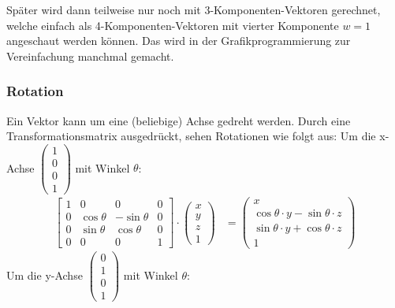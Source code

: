 \documentclass[titlepage, 11pt, a4paper, ngerman]{article}
\begin{document}
\bigbreak
Später wird dann teilweise nur noch mit 3-Komponenten-Vektoren gerechnet, welche einfach als 4-Komponenten-Vektoren mit vierter Komponente $w = 1$ angeschaut werden können. Das wird in der Grafikprogrammierung zur Vereinfachung manchmal gemacht.

\subsubsection{Rotation}
Ein Vektor kann um eine (beliebige) Achse gedreht werden. Durch eine Transformationsmatrix ausgedrückt, sehen Rotationen wie folgt aus: \bigbreak
Um die x-Achse $
\begin{pmatrix}
1 \\
0 \\
0 \\
1
\end{pmatrix}$ mit Winkel $\theta$:
\begin{align*}
    \begin{bmatrix}
    1 & 0 & 0 & 0 \\
    0 & \cos{\theta} & - \sin{\theta} & 0 \\
    0 & \sin{\theta} & \cos{\theta} & 0 \\
    0 & 0 & 0 & 1
    \end{bmatrix} \cdot
    \begin{pmatrix}
    x \\ y \\ z \\ 1
    \end{pmatrix} &=
    \begin{pmatrix}
    x \\
    \cos{\theta} \cdot y - \sin{\theta} \cdot z \\
    \sin{\theta} \cdot y + \cos{\theta} \cdot z \\
    1
    \end{pmatrix}
\end{align*}
\bigbreak
Um die y-Achse $
\begin{pmatrix}
0 \\
1 \\
0 \\
1
\end{pmatrix}$ mit Winkel $\theta$:
\end{document}
